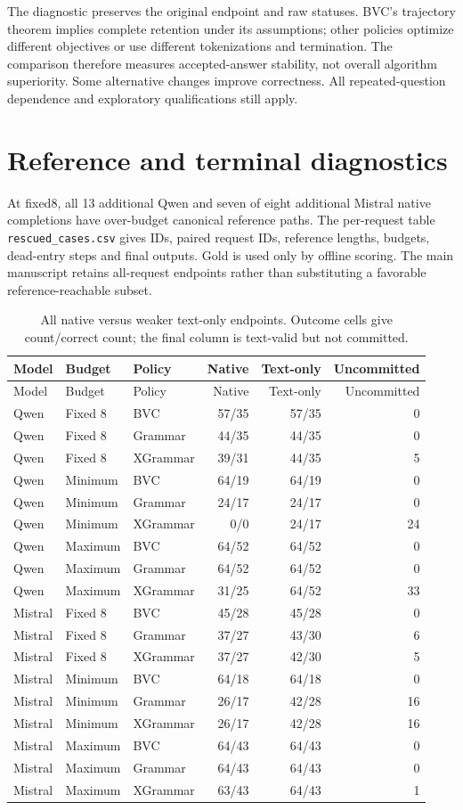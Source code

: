 \documentclass[12pt,a4paper]{article}
\newcommand{\code}[1]{\texttt{#1}}
\begin{document}
The diagnostic preserves the original endpoint and raw statuses. BVC's trajectory theorem implies complete retention under its assumptions; other policies optimize different objectives or use different tokenizations and termination. The comparison therefore measures accepted-answer stability, not overall algorithm superiority. Some alternative changes improve correctness. All repeated-question dependence and exploratory qualifications still apply.

\section{Reference and terminal diagnostics}
At fixed8, all 13 additional Qwen and seven of eight additional Mistral native completions have over-budget canonical reference paths. The per-request table \code{rescued\_cases.csv} gives IDs, paired request IDs, reference lengths, budgets, dead-entry steps and final outputs. Gold is used only by offline scoring. The main manuscript retains all-request endpoints rather than substituting a favorable reference-reachable subset.
\begin{longtable}{@{}lllrrr@{}}
\caption{All native versus weaker text-only endpoints. Outcome cells give count/correct count; the final column is text-valid but not committed.}\label{tab:terminalall}\\
\toprule
Model & Budget & Policy & Native & Text-only & Uncommitted \\
\midrule
\endfirsthead
\toprule
Model & Budget & Policy & Native & Text-only & Uncommitted \\
\midrule
\endhead
Qwen & Fixed 8 & BVC & 57/35 & 57/35 & 0 \\
Qwen & Fixed 8 & Grammar & 44/35 & 44/35 & 0 \\
Qwen & Fixed 8 & XGrammar & 39/31 & 44/35 & 5 \\
Qwen & Minimum & BVC & 64/19 & 64/19 & 0 \\
Qwen & Minimum & Grammar & 24/17 & 24/17 & 0 \\
Qwen & Minimum & XGrammar & 0/0 & 24/17 & 24 \\
Qwen & Maximum & BVC & 64/52 & 64/52 & 0 \\
Qwen & Maximum & Grammar & 64/52 & 64/52 & 0 \\
Qwen & Maximum & XGrammar & 31/25 & 64/52 & 33 \\
Mistral & Fixed 8 & BVC & 45/28 & 45/28 & 0 \\
Mistral & Fixed 8 & Grammar & 37/27 & 43/30 & 6 \\
Mistral & Fixed 8 & XGrammar & 37/27 & 42/30 & 5 \\
Mistral & Minimum & BVC & 64/18 & 64/18 & 0 \\
Mistral & Minimum & Grammar & 26/17 & 42/28 & 16 \\
Mistral & Minimum & XGrammar & 26/17 & 42/28 & 16 \\
Mistral & Maximum & BVC & 64/43 & 64/43 & 0 \\
Mistral & Maximum & Grammar & 64/43 & 64/43 & 0 \\
Mistral & Maximum & XGrammar & 63/43 & 64/43 & 1 \\
\bottomrule
\end{longtable}
\end{document}
